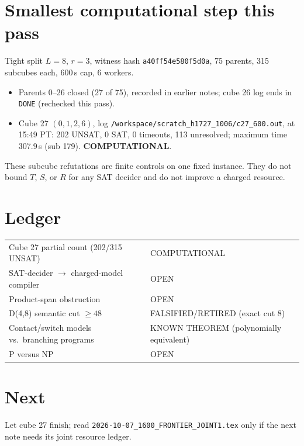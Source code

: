 \documentclass[11pt]{article}
\begin{document}
\section*{Smallest computational step this pass}
Tight split $L=8$, $r=3$, witness hash \texttt{a40ff54e580f5d0a}, 75 parents, 315 subcubes each,
600\,s cap, 6 workers.
\begin{itemize}
\item Parents 0--26 closed (27 of 75), recorded in earlier notes; cube 26 log ends in \texttt{DONE}
  (rechecked this pass).
\item Cube 27 $(0,1,2,6)$, log \texttt{/workspace/scratch\_h1727\_1006/c27\_600.out}, at 15:49 PT:
  202 UNSAT, 0 SAT, 0 timeouts, 113 unresolved; maximum time 307.9\,s (sub 179). \textbf{COMPUTATIONAL}.
\end{itemize}
These subcube refutations are finite controls on one fixed instance. They do not bound $T$, $S$, or
$R$ for any SAT decider and do not improve a charged resource.

\section*{Ledger}
\begin{tabular}{ll}
Cube 27 partial count (202/315 UNSAT) & COMPUTATIONAL\\
SAT-decider $\to$ charged-model compiler & OPEN\\
Product-span obstruction & OPEN\\
D(4,8) semantic cut $\ge 48$ & FALSIFIED/RETIRED (exact cut 8)\\
Contact/switch models vs.\ branching programs & KNOWN THEOREM (polynomially equivalent)\\
P versus NP & OPEN
\end{tabular}

\section*{Next}
Let cube 27 finish; read \texttt{2026-10-07\_1600\_FRONTIER\_JOINT1.tex} only if the next note
needs its joint resource ledger.
\end{document}
